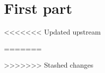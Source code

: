 \documentclass{book}
\begin{document}
	\frontmatter
		\maketitle
		\tableofcontents
	\mainmatter
		\part{First part}
<<<<<<< Updated upstream
		
=======
		
>>>>>>> Stashed changes
	\backmatter
		\printbibliography
		\printglossary
		\printglossary[type=\acronymtype]
\end{document}
